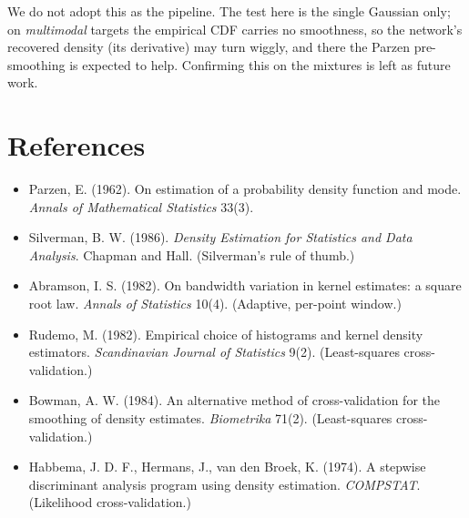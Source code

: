 \documentclass[11pt]{article}
\begin{document}
We do not adopt this as the pipeline. The test here is the single Gaussian only; on \emph{multimodal}
targets the empirical CDF carries no smoothness, so the network's recovered density (its derivative)
may turn wiggly, and there the Parzen pre-smoothing is expected to help. Confirming this on the
mixtures is left as future work.

\section*{References}
\begin{itemize}\setlength{\itemsep}{0pt}
  \item Parzen, E. (1962). On estimation of a probability density function and mode. \emph{Annals of
  Mathematical Statistics} 33(3).
  \item Silverman, B. W. (1986). \emph{Density Estimation for Statistics and Data Analysis}. Chapman
  and Hall. (Silverman's rule of thumb.)
  \item Abramson, I. S. (1982). On bandwidth variation in kernel estimates: a square root law.
  \emph{Annals of Statistics} 10(4). (Adaptive, per-point window.)
  \item Rudemo, M. (1982). Empirical choice of histograms and kernel density estimators.
  \emph{Scandinavian Journal of Statistics} 9(2). (Least-squares cross-validation.)
  \item Bowman, A. W. (1984). An alternative method of cross-validation for the smoothing of density
  estimates. \emph{Biometrika} 71(2). (Least-squares cross-validation.)
  \item Habbema, J. D. F., Hermans, J., van den Broek, K. (1974). A stepwise discriminant analysis
  program using density estimation. \emph{COMPSTAT}. (Likelihood cross-validation.)
\end{itemize}
\end{document}
